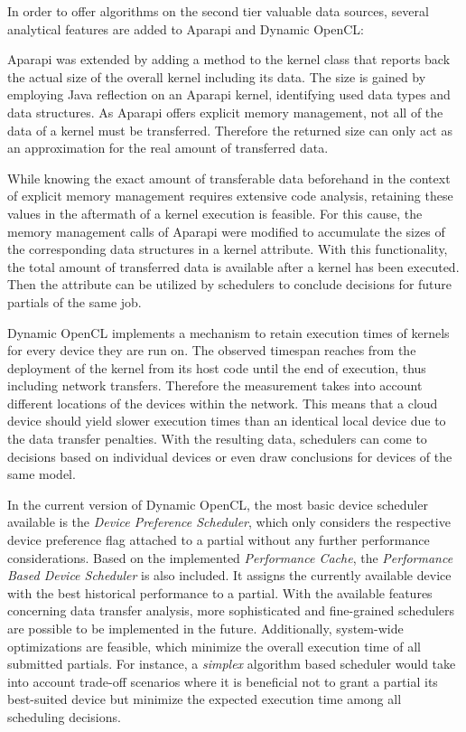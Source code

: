 In order to offer algorithms on the second tier valuable data sources, several analytical features are added to Aparapi and Dynamic OpenCL:
\begin{description}[style=nextline]
	\item[Kernel Data Size]
	Aparapi was extended by adding a method to the kernel class that reports back the actual size of the overall kernel including its data. The size is gained by employing Java reflection on an Aparapi kernel, identifying used data types and data structures. As Aparapi offers explicit memory management, not all of the data of a kernel must be transferred. Therefore the returned size can only act as an approximation for the real amount of transferred data.
	\item[Historical Data Transfer]
	While knowing the exact amount of transferable data beforehand in the context of explicit memory management requires extensive code analysis, retaining these values in the aftermath of a kernel execution is feasible. For this cause, the memory management calls of Aparapi were modified to accumulate the sizes of the corresponding data structures in a kernel attribute. With this functionality, the total amount of transferred data is available after a kernel has been executed. Then the attribute can be utilized by schedulers to conclude decisions for future partials of the same job.
	\item[Performance Cache]
	Dynamic OpenCL implements a mechanism to retain execution times of kernels for every device they are run on. The observed timespan reaches from the deployment of the kernel from its host code until the end of execution, thus including network transfers. Therefore the measurement takes into account different locations of the devices within the network. This means that a cloud device should yield slower execution times than an identical local device due to the data transfer penalties. With the resulting data, schedulers can come to decisions based on individual devices or even draw conclusions for devices of the same model.
\end{description}

In the current version of Dynamic OpenCL, the most basic device scheduler available is the \textit{Device Preference Scheduler}, which only considers the respective device preference flag attached to a partial without any further performance considerations.
Based on the implemented \textit{Performance Cache}, the \textit{Performance Based Device Scheduler} is also included. It assigns the currently available device with the best historical performance to a partial. With the available features concerning data transfer analysis, more sophisticated and fine-grained schedulers are possible to be implemented in the future. Additionally, system-wide optimizations are feasible, which minimize the overall execution time of all submitted partials. For instance, a \textit{simplex} algorithm based scheduler would take into account trade-off scenarios where it is beneficial not to grant a partial its best-suited device but minimize the expected execution time among all scheduling decisions.

